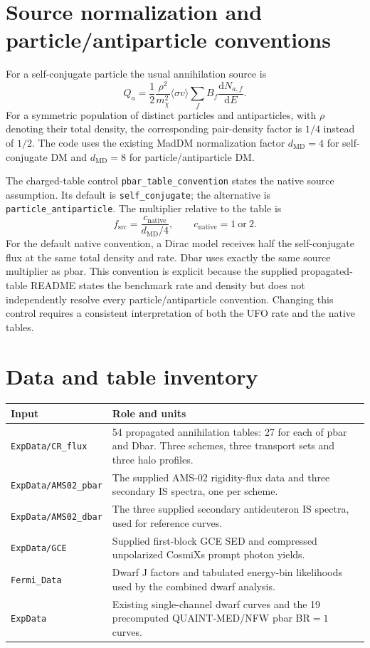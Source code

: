 \documentclass[11pt,a4paper]{article}
\newcommand{\sv}{\langle\sigma v\rangle}
\newcommand{\dd}{\mathrm{d}}
\begin{document}
\section{Source normalization and particle/antiparticle conventions}
For a self-conjugate particle the usual annihilation source is
\begin{equation}
Q_a=\frac{1}{2}\frac{\rho^2}{m_\chi^2}\sv\sum_f B_f\frac{\dd N_{a,f}}{\dd E}.
\end{equation}
For a symmetric population of distinct particles and antiparticles, with $\rho$ denoting their total density, the corresponding pair-density factor is $1/4$ instead of $1/2$. The code uses the existing MadDM normalization factor $d_{\mathrm{MD}}=4$ for self-conjugate DM and $d_{\mathrm{MD}}=8$ for particle/antiparticle DM.

The charged-table control \texttt{pbar\_table\_convention} states the native source assumption. Its default is \texttt{self\_conjugate}; the alternative is \texttt{particle\_antiparticle}. The multiplier relative to the table is
\begin{equation}
f_{\mathrm{src}}=\frac{c_{\mathrm{native}}}{d_{\mathrm{MD}}/4},\qquad
c_{\mathrm{native}}=1\ \mathrm{or}\ 2.
\end{equation}
For the default native convention, a Dirac model receives half the self-conjugate flux at the same total density and rate. Dbar uses exactly the same source multiplier as pbar. This convention is explicit because the supplied propagated-table README states the benchmark rate and density but does not independently resolve every particle/antiparticle convention. Changing this control requires a consistent interpretation of both the UFO rate and the native tables.

\section{Data and table inventory}
\begin{longtable}{p{.23\linewidth}p{.69\linewidth}}
\toprule Input & Role and units\\\midrule\endhead
\texttt{ExpData/CR\_flux} & 54 propagated annihilation tables: 27 for each of pbar and Dbar. Three schemes, three transport sets and three halo profiles.\\
\texttt{ExpData/AMS02\_pbar} & The supplied AMS-02 rigidity-flux data and three secondary IS spectra, one per scheme.\\
\texttt{ExpData/AMS02\_dbar} & The three supplied secondary antideuteron IS spectra, used for reference curves.\\
\texttt{ExpData/GCE} & Supplied first-block GCE SED and compressed unpolarized CosmiXs prompt photon yields.\\
\texttt{Fermi\_Data} & Dwarf J factors and tabulated energy-bin likelihoods used by the combined dwarf analysis.\\
\texttt{ExpData} & Existing single-channel dwarf curves and the 19 precomputed QUAINT-MED/NFW pbar BR$=1$ curves.\\\bottomrule
\end{longtable}
\end{document}
